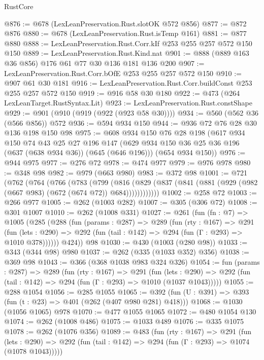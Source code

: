 \begin{lexlean}{RustCore}
\begin{coremodule}
@876 := @678 (LexLeanPreservation.Rust.slotOK @572 @856)
@877 := @872 @876
@880 := @678 (LexLeanPreservation.Rust.isTemp @161)
@881 := @877 @880
@888 := LexLeanPreservation.Rust.Corr.kIf @253 @255 @257 @572 @150 @150
@889 := LexLeanPreservation.Rust.Kind.nat
@901 := @888 (@889 @163 @36 @856) @176 @61 @77 @30 @136 @181 @136 @200
@907 := LexLeanPreservation.Rust.Corr.bOfE @253 @255 @257 @572 @150
@910 := @907 @61 @30 @181
@916 := LexLeanPreservation.Rust.Corr.buildConst @253 @255 @257 @572 @150
@919 := @916 @58 @30 @180
@922 := @473 (@264 LexLeanTarget.RustSyntax.Lit)
@923 := LexLeanPreservation.Rust.constShape
@929 := @901 (@910 (@919 (@922 (@923 @58 @30))))
@934 := @560 (@562 @36 (@566 @856)) @572
@936 := @594 @934 @150
@944 := @936 @72 @76 @28 @30 @136 @198 @150 @98
@975 := @608
    @934
    @150
    @76
    @28
    @198
    (@617
      @934
      @150
      @74
      @43
      @25
      @27
      @196
      @147
      (@629 @934 @150 @36 @25 @36 @196 (@637 (@638 @934 @36)) (@645 (@646 @196)))
      (@654 @934 @150))
@976 := @944 @975
@977 := @276 @72
@978 := @474 @977
@979 := @976 @978
@980 := @348 @98
@982 := @979 (@663 @980)
@983 := @372 @98
@1001 := @721
    (@762
      (@764
        (@766
          (@783
            (@799
              (@816
                (@829 (@837 (@841 (@881 (@929 (@982 (@667 @983) (@672 (@674 @72)) @684))))))))))))
@1002 := @258 @72
@1003 := @266 @977
@1005 := @262 (@1003 @282)
@1007 := @305 (@306 @72)
@1008 := @301 @1007
@1010 := @262 (@1008 @331)
@1027 := @261
    (fun (fn : @7) =>
    @1005
      (@285
        (@288
          (fun (params : @287) =>
          @289
            (fun (rty : @167) =>
            @291
              (fun (lets : @290) =>
              @292 (fun (tail : @142) => @294 (fun (Γ : @293) => @1010 @378))))))
        @424))
    @98
@1030 := @430 (@1003 (@280 @98))
@1033 := @343 (@344 @98) @980
@1037 := @262 (@335 (@1033 @352) @356)
@1038 := @369 @98
@1043 := @366 (@368 @1038 @983 @324 @326)
@1054 := fun (params : @287) =>
  @289
    (fun (rty : @167) =>
    @291
      (fun (lets : @290) =>
      @292 (fun (tail : @142) => @294 (fun (Γ : @293) => @1010 (@1037 @1043)))))
@1055 := @288 @1054
@1056 := @285 @1055
@1065 := @392 (fun (U : @391) => @393 (fun (t : @23) => @401 (@262 (@407 @980 @281) @418)))
@1068 := @1030 (@1056 @1065) @978
@1070 := @477 @1055 @1065
@1072 := @480 @1054 @130
@1074 := @262 (@1008 @486)
@1075 := @1033 @489
@1076 := @335 @1075
@1078 := @262 (@1076 @356)
@1089 := @483
    (fun (rty : @167) =>
    @291
      (fun (lets : @290) =>
      @292 (fun (tail : @142) => @294 (fun (Γ : @293) => @1074 (@1078 @1043)))))

\end{coremodule}
\end{lexlean}
